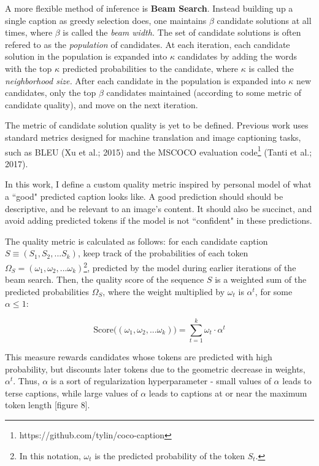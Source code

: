 \documentclass[letterpaper, 10 pt, conference]{ieeeconf}
\begin{document}
A more flexible method of inference is \textbf{Beam Search}. Instead building up a single caption as greedy selection does, one maintains $\beta$ candidate solutions at all times, where $\beta$ is called the \textit{beam width.} The set of candidate solutions is often refered to as the \textit{population} of candidates. At each iteration, each candidate solution in the population is expanded into $\kappa$ candidates by adding the words with the top $\kappa$ predicted probabilities to the candidate, where $\kappa$ is called the \textit{neighborhood size.} After each candidate in the population is expanded into $\kappa$ new candidates, only the top $\beta$ candidates maintained (according to some metric of candidate quality), and move on the next iteration. 

The metric of candidate solution quality is yet to be defined. Previous work uses standard metrics designed for machine translation and image captioning tasks, such as BLEU (Xu et al.; 2015) and the MSCOCO evaluation code\footnote{https://github.com/tylin/coco-caption} (Tanti et al.; 2017). 

In this work, I define a custom quality metric inspired by personal model of what a ``good" predicted caption looks like. A good prediction should should be descriptive, and be relevant to an image's content. It should also be succinct, and avoid adding predicted tokens if the model is not ``confident" in these predictions. 

The quality metric is calculated as follows: for each candidate caption $S \equiv (S_1, S_2, ... S_k)$, keep track of the probabilities of each token $\Omega_S = (\omega_1, \omega_2, ... \omega_k)$\footnote{In this notation, $\omega_t$ is the predicted probability of the token $S_t$.}, predicted by the model during earlier iterations of the beam search. Then, the quality score of the sequence $S$ is a weighted sum of the predicted probabilities $\Omega_S$, where the weight multiplied by $\omega_t$ is $\alpha^t$, for some $\alpha \leq 1$: 

\begin{equation}
\text{Score}\big ( (\omega_1, \omega_2, ... \omega_k) \big ) = \sum_{t = 1}^k \omega_t\cdot\alpha^t
\end{equation}

This measure rewards candidates whose tokens are predicted with high probability, but discounts later tokens due to the geometric decrease in weights, $\alpha^t$. Thus, $\alpha$ is a sort of regularization hyperparameter - small values of $\alpha$ leads to terse captions, while large values of $\alpha$ leads to captions at or near the maximum token length [figure 8].  
\end{document}
